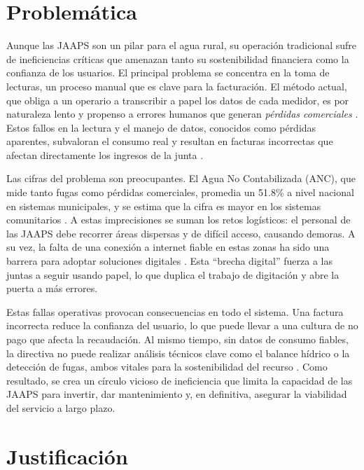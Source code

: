 \section{Problemática}
\label{sec:problem_statement}

Aunque las JAAPS son un pilar para el agua rural, su operación tradicional sufre de ineficiencias críticas que amenazan tanto su sostenibilidad financiera como la confianza de los usuarios. El principal problema se concentra en la toma de lecturas, un proceso manual que es clave para la facturación. El método actual, que obliga a un operario a transcribir a papel los datos de cada medidor, es por naturaleza lento y propenso a errores humanos que generan \textit{pérdidas comerciales} \parencite{Chaki2019Automation}. Estos fallos en la lectura y el manejo de datos, conocidos como pérdidas aparentes, subvaloran el consumo real y resultan en facturas incorrectas que afectan directamente los ingresos de la junta \parencite{ANC2025}.

Las cifras del problema son preocupantes. El Agua No Contabilizada (ANC), que mide tanto fugas como pérdidas comerciales, promedia un 51.8\% a nivel nacional en sistemas municipales, y se estima que la cifra es mayor en los sistemas comunitarios \parencite{INEC2023}. A estas imprecisiones se suman los retos logísticos: el personal de las JAAPS debe recorrer áreas dispersas y de difícil acceso, causando demoras. A su vez, la falta de una conexión a internet fiable en estas zonas ha sido una barrera para adoptar soluciones digitales \parencite{Fieldeke2021}. Esta ``brecha digital'' fuerza a las juntas a seguir usando papel, lo que duplica el trabajo de digitación y abre la puerta a más errores.

Estas fallas operativas provocan consecuencias en todo el sistema. Una factura incorrecta reduce la confianza del usuario, lo que puede llevar a una cultura de no pago que afecta la recaudación. Al mismo tiempo, sin datos de consumo fiables, la directiva no puede realizar análisis técnicos clave como el balance hídrico o la detección de fugas, ambos vitales para la sostenibilidad del recurso \parencite{ANC2025}. Como resultado, se crea un círculo vicioso de ineficiencia que limita la capacidad de las JAAPS para invertir, dar mantenimiento y, en definitiva, asegurar la viabilidad del servicio a largo plazo.

\section{Justificación}
\label{sec:justification}

